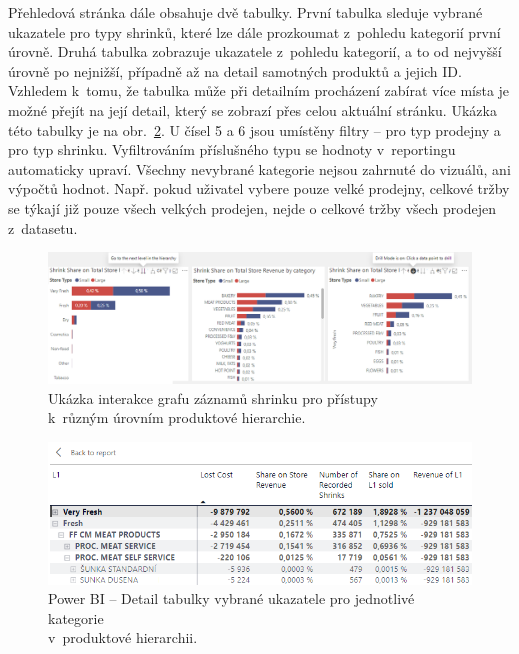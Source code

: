 Přehledová stránka dále obsahuje dvě tabulky. První tabulka sleduje vybrané ukazatele pro typy shrinků, které lze dále prozkoumat z~pohledu kategorií první úrovně. Druhá tabulka zobrazuje ukazatele z~pohledu kategorií, a to od nejvyšší úrovně po nejnižší, případně až na detail samotných produktů a jejich ID. Vzhledem k~tomu, že tabulka může při detailním procházení zabírat více místa je možné přejít na její detail, který se zobrazí přes celou aktuální stránku. Ukázka této tabulky je na obr.~\ref*{obr:PBI:tab1}.
U čísel 5 a 6 jsou umístěny filtry -- pro typ prodejny a pro typ shrinku. Vyfiltrováním příslušného typu se hodnoty v~reportingu automaticky upraví. Všechny nevybrané kategorie nejsou zahrnuté do vizuálů, ani výpočtů hodnot. Např. pokud uživatel vybere pouze velké prodejny, celkové tržby se týkají již pouze všech velkých prodejen, nejde o celkové tržby všech prodejen z~datasetu.

\begin{figure}[h!]
    \centering
    \captionsetup{justification=centering}
    \includegraphics[width=\textwidth]{obrazky/PBI/Catdrilldown.png}
    \caption{Ukázka interakce grafu záznamů shrinku pro přístupy \\ k~různým úrovním produktové hierarchie.}
    \label{obr:PBI:drill}
\end{figure}

\begin{figure}[h!]
    \centering
    \captionsetup{justification=centering}
    \includegraphics[width=\textwidth]{obrazky/PBI/tabulkaukzka.png}
    \caption{Power BI -- Detail tabulky vybrané ukazatele pro jednotlivé kategorie \\ v~produktové hierarchii.}
    \label{obr:PBI:tab1}
\end{figure}


